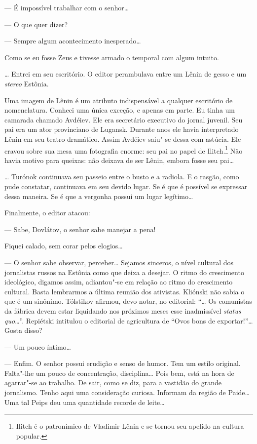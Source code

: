 --- É impossível trabalhar com o senhor\ldots{}

--- O que quer dizer?

--- Sempre algum acontecimento inesperado\ldots{}

Como se eu fosse Zeus e tivesse armado o temporal com algum intuito.

\ldots{} Entrei em seu escritório. O editor perambulava entre um Lênin de
gesso e um \emph{stereo} Estônia.

Uma imagem de Lênin é um atributo indispensável a qualquer escritório de
nomenclatura. Conheci uma única exceção, e apenas em parte. Eu tinha um
camarada chamado Avdéiev. Ele era secretário executivo do jornal
juvenil. Seu pai era um ator provinciano de Lugansk. Durante anos ele
havia interpretado Lênin em seu teatro dramático. Assim Avdéiev saiu"-se
dessa com astúcia. Ele cravou sobre sua mesa uma fotografia enorme: seu
pai no papel de Ilitch.\footnote{Ilitch é o patronímico de Vladímir
  Lênin e se tornou seu apelido na cultura popular.} Não havia motivo
para queixas: não deixava de ser Lênin, embora fosse seu pai\ldots{}

\ldots{} Turónok continuava seu passeio entre o busto e a radiola. E o
rasgão, como pude constatar, continuava em seu devido lugar. Se é que é
possível se expressar dessa maneira. Se é que a vergonha possui um lugar
legítimo\ldots{}

Finalmente, o editor atacou:

--- Sabe, Dovlátov, o senhor sabe manejar a pena!

Fiquei calado, sem corar pelos elogios\ldots{}

--- O senhor sabe observar, perceber\ldots{} Sejamos sinceros, o nível
cultural dos jornalistas russos na Estônia como que deixa a desejar. O
ritmo do crescimento ideológico, digamos assim, adiantou"-se em relação
ao ritmo do crescimento cultural. Basta lembrarmos a última reunião dos
ativistas. Kliónski não sabia o que é um sinônimo. Tólstikov afirmou,
devo notar, no editorial: ``\ldots{} Os comunistas da fábrica devem estar
liquidando nos próximos meses esse inadmissível \emph{status quo}\ldots{}''.
Repiétski intitulou o editorial de agricultura de ``Ovos bons de
exportar!''\ldots{} Gosta disso?

--- Um pouco íntimo\ldots{}

--- Enfim. O senhor possui erudição e senso de humor. Tem um
estilo original. Falta"-lhe um pouco de concentração, disciplina\ldots{}
Pois bem, está na hora de agarrar"-se ao trabalho. De sair, como se diz,
para a vastidão do grande jornalismo. Tenho aqui uma consideração
curiosa. Informam da região de Paide\ldots{} Uma tal Peips deu uma quantidade
recorde de leite\ldots{}

